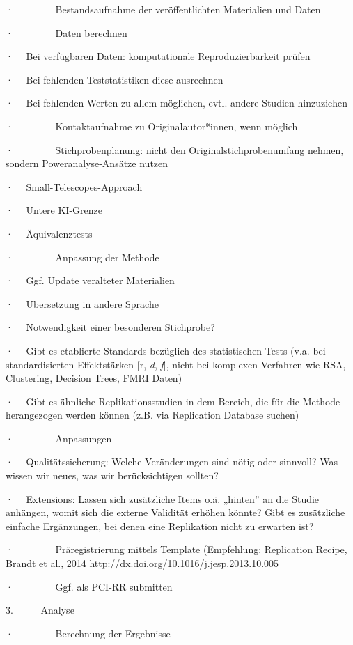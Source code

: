 \documentclass[
  letterpaper,
  DIV=11,
  numbers=noendperiod]{scrreprt}
\begin{document}
·~~~~~~~~ Bestandsaufnahme der veröffentlichten Materialien und Daten

·~~~~~~~~ Daten berechnen

·~~ Bei verfügbaren Daten: komputationale Reproduzierbarkeit prüfen

·~~ Bei fehlenden Teststatistiken diese ausrechnen

·~~ Bei fehlenden Werten zu allem möglichen, evtl. andere Studien
hinzuziehen

·~~~~~~~~ Kontaktaufnahme zu Originalautor*innen, wenn möglich

·~~~~~~~~ Stichprobenplanung: nicht den Originalstichprobenumfang
nehmen, sondern Poweranalyse-Ansätze nutzen

·~~ Small-Telescopes-Approach

·~~ Untere KI-Grenze

·~~ Äquivalenztests

·~~~~~~~~ Anpassung der Methode

·~~ Ggf. Update veralteter Materialien

·~~ Übersetzung in andere Sprache

·~~ Notwendigkeit einer besonderen Stichprobe?

·~~ Gibt es etablierte Standards bezüglich des statistischen Tests (v.a.
bei standardisierten Effektstärken {[}r, \emph{d}, \emph{f}{]}, nicht
bei komplexen Verfahren wie RSA, Clustering, Decision Trees, FMRI Daten)

·~~ Gibt es ähnliche Replikationsstudien in dem Bereich, die für die
Methode herangezogen werden können (z.B. via Replication Database
suchen)

·~~~~~~~~ Anpassungen

·~~ Qualitätssicherung: Welche Veränderungen sind nötig oder sinnvoll?
Was wissen wir neues, was wir berücksichtigen sollten?

·~~ Extensions: Lassen sich zusätzliche Items o.ä. „hinten'' an die
Studie anhängen, womit sich die externe Validität erhöhen könnte? Gibt
es zusätzliche einfache Ergänzungen, bei denen eine Replikation nicht zu
erwarten ist?

·~~~~~~~~ Präregistrierung mittels Template (Empfehlung: Replication
Recipe, Brandt et al., 2014
\url{http://dx.doi.org/10.1016/j.jesp.2013.10.005}

·~~~~~~~~ Ggf. als PCI-RR submitten

3.~~~~~ Analyse

·~~~~~~~~ Berechnung der Ergebnisse
\end{document}
